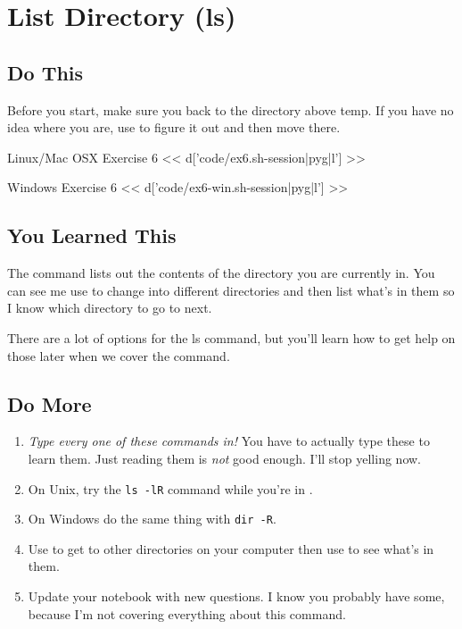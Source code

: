\chapter{List Directory (ls)}

\section{Do This}

Before you start, make sure you  back to the directory above temp.
If you have no idea where you are, use  to figure it out and then
move there.

\begin{code}{Linux/Mac OSX Exercise 6}
<< d['code/ex6.sh-session|pyg|l'] >>
\end{code}

\begin{code}{Windows Exercise 6}
<< d['code/ex6-win.sh-session|pyg|l'] >>
\end{code}

\section{You Learned This}

The  command lists out the contents of the directory you
are currently in.  You can see me use  to change into different
directories and then list what's in them so I know which directory to go to next.

There are a lot of options for the ls command, but you'll learn how to get
help on those later when we cover the  command.

\section{Do More}

\begin{enumerate}
\item \emph{Type every one of these commands in!} You have to actually type these
    to learn them.  Just reading them is \emph{not} good enough.  I'll stop yelling
    now.
\item On Unix, try the \verb|ls -lR| command while you're in .
\item On Windows do the same thing with \verb|dir -R|.
\item Use  to get to other directories on your computer then use  to see what's in them.
\item Update your notebook with new questions.  I know you probably have some, because I'm
    not covering everything about this command.
\end{enumerate}

